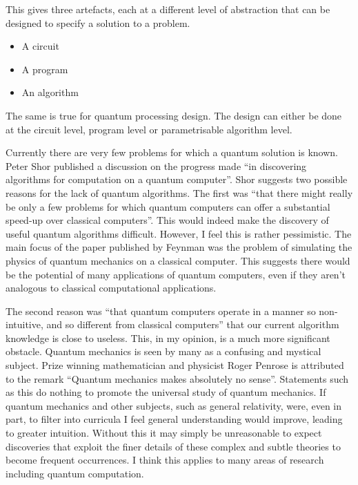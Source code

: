 This gives three artefacts, each at a different level of abstraction that can be designed to specify a solution to a problem.
\begin{itemize}
 \item A circuit
 \item A program
 \item An algorithm
\end{itemize}

The same is true for quantum processing design.
The design can either be done at the circuit level, program level or parametrisable algorithm level.

Currently there are very few problems for which a quantum solution is known.
Peter Shor published a discussion on the progress made ``in discovering algorithms for computation on a quantum computer''\cite{Shor:2004:PQA:1032132.1032149}.
Shor suggests two possible reasons for the lack of quantum algorithms.
The first was ``that there might really be only a few problems for which quantum computers can offer a substantial speed-up over classical computers''\cite{Shor:2004:PQA:1032132.1032149}.
This would indeed make the discovery of useful quantum algorithms difficult.
However, I feel this is rather pessimistic.
The main focus of the paper published by Feynman\cite{Feynman82simulatingphysics} was the problem of simulating the physics of quantum mechanics on a classical computer.
This suggests there would be the potential of many applications of quantum computers, even if they aren't analogous to classical computational applications.

The second reason was ``that quantum computers operate in a manner so non-intuitive, and so different from classical computers''\cite{Shor:2004:PQA:1032132.1032149} that our current algorithm knowledge is close to useless.
This, in my opinion, is a much more significant obstacle.
Quantum mechanics is seen by many as a confusing and mystical subject.
Prize winning mathematician and physicist Roger Penrose is attributed to the remark ``Quantum mechanics makes absolutely no sense''.
Statements such as this do nothing to promote the universal study of quantum mechanics.
If quantum mechanics and other subjects, such as general relativity, were, even in part, to filter into curricula I feel general understanding would improve, leading to greater intuition.
Without this it may simply be unreasonable to expect discoveries that exploit the finer details of these complex and subtle theories to become frequent occurrences.
I think this applies to many areas of research including quantum computation.

